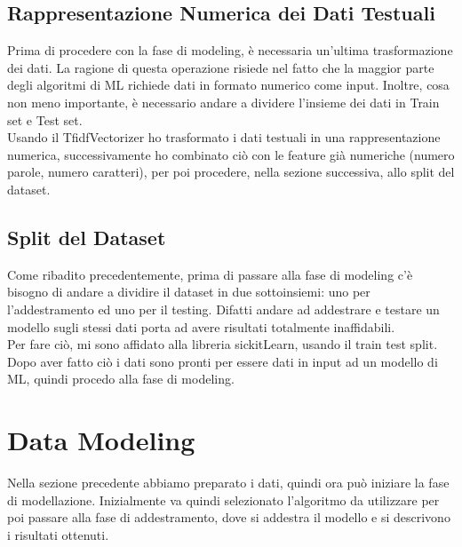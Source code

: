 \documentclass[]{article}
\begin{document}
        \subsection{Rappresentazione Numerica dei Dati Testuali}
            Prima di procedere con la fase di modeling, è necessaria un'ultima trasformazione dei dati. La ragione di questa operazione risiede nel fatto che la maggior parte degli algoritmi di ML richiede dati in formato numerico come input. Inoltre, cosa non meno importante, è necessario andare a dividere l'insieme dei dati in Train set e Test set.\\
            Usando il TfidfVectorizer ho trasformato i dati testuali in una rappresentazione numerica, successivamente ho combinato ciò con le feature già numeriche (numero parole, numero caratteri), per poi procedere, nella sezione successiva, allo split del dataset.

        \subsection{Split del Dataset}
            Come ribadito precedentemente, prima di passare alla fase di modeling c'è bisogno di andare a dividire il dataset in due sottoinsiemi: uno per l'addestramento ed uno per il testing. Difatti andare ad addestrare e testare un modello sugli stessi dati porta ad avere risultati totalmente inaﬃdabili.\\
            Per fare ciò, mi sono affidato alla libreria sickitLearn, usando il train test split.
            Dopo aver fatto ciò i dati sono pronti per essere dati in input ad un modello di ML, quindi procedo alla fase di modeling.

        \newpage
        \section{Data Modeling}
            Nella sezione precedente abbiamo preparato i dati, quindi ora può iniziare la fase di modellazione. Inizialmente va quindi selezionato l’algoritmo da
            utilizzare per poi passare alla fase di addestramento, dove si addestra il modello e si descrivono i risultati ottenuti.
\end{document}
